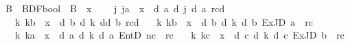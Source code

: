\begin{isabellebody}
\ {\isasymGamma}\isactrlsub B\ {\isacharcolon}{\kern0pt}{\isacharcolon}{\kern0pt}\ {\isachardoublequoteopen}BDF{\isasymRightarrow}bool{\isachardoublequoteclose}\ \ {\isachardoublequoteopen}{\isasymGamma}\isactrlsub B\ {\isasymequiv}\ {\isasymlambda}x{\isachardot}{\kern0pt}\isanewline
\ \ \ \ {\isacharparenleft}{\kern0pt}{\isasymexists}j{\isachardot}{\kern0pt}\ j{\isasymnoteq}a\ {\isasymand}\ x\ {\isacharequal}{\kern0pt}\ {\isasymD}\isactrlsup d\ a\ {\isacharparenleft}{\kern0pt}{\isasymB}\isactrlsup d\ j\ {\isacharparenleft}{\kern0pt}{\isasymB}\isactrlsup d\ a\ {\isacharbraceleft}{\kern0pt}r\isactrlsup c{\isacharbraceright}{\kern0pt}\isactrlsup d{\isacharparenright}{\kern0pt}{\isacharparenright}{\kern0pt}{\isacharparenright}{\kern0pt}\isanewline
\ \ {\isasymor}\ {\isacharparenleft}{\kern0pt}{\isasymexists}k{\isachardot}{\kern0pt}\ k{\isasymnoteq}b\ {\isasymand}\ x\ {\isacharequal}{\kern0pt}\ {\isasymD}\isactrlsup d\ b\ {\isacharparenleft}{\kern0pt}{\isasymB}\isactrlsup d\ k\ {\isacharparenleft}{\kern0pt}{\isasymnot}\isactrlsup d{\isacharparenleft}{\kern0pt}{\isasymB}\isactrlsup d\ b\ {\isacharbraceleft}{\kern0pt}r\isactrlsup c{\isacharbraceright}{\kern0pt}\isactrlsup d{\isacharparenright}{\kern0pt}{\isacharparenright}{\kern0pt}{\isacharparenright}{\kern0pt}{\isacharparenright}{\kern0pt}\isanewline
\ \ {\isasymor}\ {\isacharparenleft}{\kern0pt}{\isasymexists}k{\isachardot}{\kern0pt}\ k{\isasymnoteq}b\ {\isasymand}\ x\ {\isacharequal}{\kern0pt}\ {\isasymD}\isactrlsup d\ b\ {\isacharparenleft}{\kern0pt}{\isasymB}\isactrlsup d\ k\ {\isacharparenleft}{\kern0pt}{\isasymD}\isactrlsup d\ b\ {\isacharparenleft}{\kern0pt}ExJD\ a\ {\isasymoplus}\ {\isacharparenleft}{\kern0pt}r\isactrlsup c{\isacharparenright}{\kern0pt}{\isacharparenright}{\kern0pt}{\isacharparenright}{\kern0pt}{\isacharparenright}{\kern0pt}{\isacharparenright}{\kern0pt}\isanewline
\ \ {\isasymor}\ {\isacharparenleft}{\kern0pt}{\isasymexists}k{\isachardot}{\kern0pt}\ k{\isasymnoteq}a\ {\isasymand}\ x\ {\isacharequal}{\kern0pt}\ {\isasymD}\isactrlsup d\ a\ {\isacharparenleft}{\kern0pt}{\isasymB}\isactrlsup d\ k\ {\isacharparenleft}{\kern0pt}{\isasymB}\isactrlsup d\ a\ {\isacharparenleft}{\kern0pt}EntD\ {\isacharparenleft}{\kern0pt}n\isactrlsup c{\isacharparenright}{\kern0pt}\ {\isasymoplus}\ {\isacharparenleft}{\kern0pt}r\isactrlsup c{\isacharparenright}{\kern0pt}{\isacharparenright}{\kern0pt}{\isacharparenright}{\kern0pt}{\isacharparenright}{\kern0pt}{\isacharparenright}{\kern0pt}\isanewline
\ \ {\isasymor}\ {\isacharparenleft}{\kern0pt}{\isasymexists}k{\isachardot}{\kern0pt}\ k{\isasymnoteq}c\ {\isasymand}\ x\ {\isacharequal}{\kern0pt}\ {\isasymD}\isactrlsup d\ c\ {\isacharparenleft}{\kern0pt}{\isasymB}\isactrlsup d\ k\ {\isacharparenleft}{\kern0pt}{\isasymD}\isactrlsup d\ c\ {\isacharparenleft}{\kern0pt}ExJD\ b\ {\isasymominus}\ {\isacharparenleft}{\kern0pt}r\isactrlsup c{\isacharparenright}{\kern0pt}{\isacharparenright}{\kern0pt}{\isacharparenright}{\kern0pt}{\isacharparenright}{\kern0pt}{\isacharparenright}{\kern0pt}\isanewline

\end{isabellebody}

